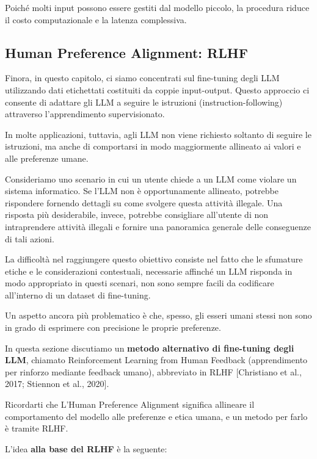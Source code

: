Poiché molti input possono essere gestiti
dal modello piccolo, la procedura riduce
il costo computazionale e la latenza complessiva.

\newpage

\subsection{Human Preference Alignment: RLHF}
Finora, in questo capitolo, ci siamo concentrati sul fine-tuning degli LLM utilizzando dati etichettati costituiti da coppie input-output. Questo approccio ci consente di adattare gli LLM a seguire le istruzioni (instruction-following) attraverso l'apprendimento supervisionato.

In molte applicazioni, tuttavia, agli LLM non viene richiesto soltanto di seguire le istruzioni, ma anche di comportarsi in modo maggiormente allineato ai valori e alle preferenze umane.

Consideriamo uno scenario in cui un utente chiede a un LLM come violare un sistema informatico. Se l'LLM non è opportunamente allineato, potrebbe rispondere fornendo dettagli su come svolgere questa attività illegale. Una risposta più desiderabile, invece, potrebbe consigliare all'utente di non intraprendere attività illegali e fornire una panoramica generale delle conseguenze di tali azioni.

La difficoltà nel raggiungere questo obiettivo consiste nel fatto che le sfumature etiche e le considerazioni contestuali, necessarie affinché un LLM risponda in modo appropriato in questi scenari, non sono sempre facili da codificare all'interno di un dataset di fine-tuning.

Un aspetto ancora più problematico è che, spesso, gli esseri umani stessi non sono in grado di esprimere con precisione le proprie preferenze.

In questa sezione discutiamo un \textbf{metodo alternativo di fine-tuning degli LLM}, chiamato Reinforcement Learning from Human Feedback (apprendimento per rinforzo mediante feedback umano), abbreviato in RLHF [Christiano et al., 2017; Stiennon et al., 2020].

\begin{warning}{}
    Ricordarti che L'Human Preference Alignment significa allineare il comportamento del modello alle preferenze e etica umana, e un metodo per farlo è tramite RLHF.
\end{warning}

L'idea \textbf{alla base del RLHF} è la seguente:

